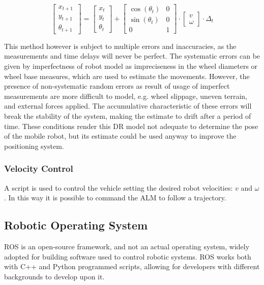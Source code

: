 \begin{equation}
\begin{bmatrix} x_{t + 1} \\ y_{t + 1} \\ \theta _{t + 1} ~ \end{bmatrix}
= 
\begin{bmatrix} {x_t} \\ {y_t} \\ {\theta _t}  \end{bmatrix} 
+ 
\begin{bmatrix}  \cos (\theta _t ) & 0\\  \sin (\theta _t ) & 0 \\ 0 & 1 \end{bmatrix}
\cdot 
\begin{bmatrix} v \\ \omega \end{bmatrix} \cdot
\Delta_t
\label{eq:euler}
\end{equation}


This method however is subject to multiple errors and inaccuracies, as the measurements and time delays will never be perfect. 
The systematic errors can be given by imperfectness of robot model as impreciseness in the wheel diameters or wheel base measures, which are used to estimate the movements. 
However, the presence of non-systematic random errors as result of usage of imperfect measurements are more difficult to model, e.g. wheel slippage, uneven terrain, and external forces applied.
The accumulative characteristic of these errors will break the stability of the system, making the estimate to drift after a period of time.
These conditions render this \gls{DR} model not adequate to determine the pose of the mobile robot, but its estimate could be used anyway to improve the positioning system. 


\subsubsection{Velocity Control}
\label{sec:control}
\noindent A script is used to control the vehicle setting the desired robot velocities: $v$ and $\omega$.
In this way it is possible to command the \gls{ALM} to follow a trajectory.

\subsection{Robotic Operating System}

\noindent \Gls{ROS}\cite{288} is an open-source framework, and not an actual operating system, widely adopted for building software used to control robotic systems.
\Gls{ROS} works both with C++ and Python programmed scripts, allowing for developers with different backgrounds to develop upon it.

